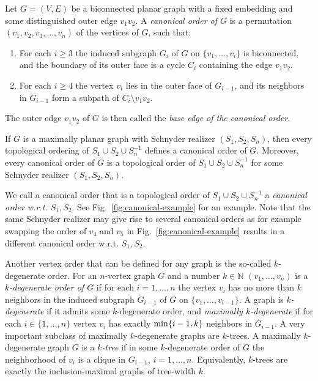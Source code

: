 \documentclass{llncs}
\begin{document}
\begin{definition}\label{def:canonical-order}
 Let $G = (V,E)$ be a biconnected planar graph with a fixed embedding and some distinguished outer edge $v_1v_2$. A \emph{canonical order of $G$} is a permutation $(v_1,v_2,v_3,\ldots,v_n)$ of the vertices of $G$, such that:
 \begin{enumerate}[label =(\roman*)]
  \item For each $i \geq 3$ the induced subgraph $G_i$ of $G$ on $\{v_1,\ldots,v_i\}$ is biconnected, and the boundary of its outer face is a cycle $C_i$ containing the edge $v_1v_2$.
  \item For each $i \geq 4$ the vertex $v_i$ lies in the outer face of $G_{i-1}$, and its neighbors in $G_{i-1}$ form a subpath of $C_i \setminus v_1v_2$.
 \end{enumerate}
 The outer edge $v_1v_2$ of $G$ is then called the \emph{base edge of the canonical order}.
\end{definition}

\begin{lemma}\label{lem:Schnyder-canonical}
 If $G$ is a maximally planar graph with Schnyder realizer $(S_1,S_2,S_n)$, then every topological ordering of $S_1 \cup S_2 \cup S_n^{-1}$ defines a canonical order of $G$. Moreover, every canonical order of $G$ is a topological order of $S_1 \cup S_2 \cup S_n^{-1}$ for some Schnyder realizer $(S_1,S_2,S_n)$.
\end{lemma}

We call a canonical order that is a topological order of $S_1\cup S_2 \cup S_n^{-1}$ a \emph{canonical order w.r.t. $S_1,S_2$}. See Fig.~\ref{fig:canonical-example} for an example. Note that the same Schnyder realizer may give rise to several canonical orders as for example swapping the order of $v_4$ and $v_5$ in Fig.~\ref{fig:canonical-example} results in a different canonical order w.r.t. $S_1,S_2$.

\medskip

Another vertex order that can be defined for any graph is the so-called $k$-degenerate order. For an $n$-vertex graph $G$ and a number $k \in \mathbb{N}$ $(v_1,\ldots,v_n)$ is a \emph{$k$-degenerate order of $G$} if for each $i = 1,\ldots,n$ the vertex $v_i$ has no more than $k$ neighbors in the induced subgraph $G_{i-1}$ of $G$ on $\{v_1,\ldots,v_{i-1}\}$. A graph is \emph{$k$-degenerate} if it admits some $k$-degenerate order, and \emph{maximally $k$-degenerate} if for each $i \in \{1,\ldots,n\}$ vertex $v_i$ has exactly ${\rm min}\{i-1,k\}$ neighbors in $G_{i-1}$. A very important subclass of maximally $k$-degenerate graphs are $k$-trees. A maximally $k$-degenerate graph $G$ is a \emph{$k$-tree} if in some $k$-degenerate order of $G$ the neighborhood of $v_i$ is a clique in $G_{i-1}$, $i = 1,\ldots,n$. Equivalently, $k$-trees are exactly the inclusion-maximal graphs of tree-width $k$.
\end{document}
